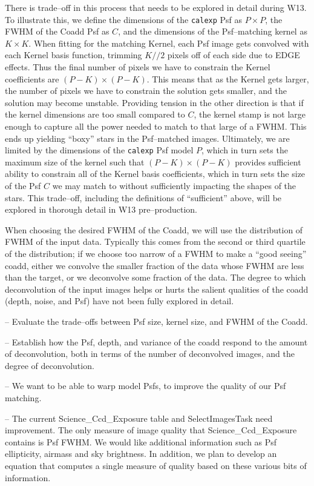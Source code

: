 \documentclass[prd, nofootinbib, floatfix, 11pt,tightenlines,times]{article}
\begin{document}
There is trade--off in this process that needs to be explored in
detail during W13.  To illustrate this, we define the dimensions of
the {\tt calexp} Psf as $P \times P$, the FWHM of the Coadd Psf as
$C$, and the dimensions of the Psf--matching kernel as $K \times K$.
When fitting for the matching Kernel, each Psf image gets convolved
with each Kernel basis function, trimming $K//2$ pixels off of each
side due to EDGE effects.  Thus the final number of pixels we have to
constrain the Kernel coefficients are $(P-K) \times (P-K)$.  This
means that as the Kernel gets larger, the number of pixels we have to
constrain the solution gets smaller, and the solution may become
unstable.  Providing tension in the other direction is that if the
kernel dimensions are too small compared to $C$, the kernel stamp is
not large enough to capture all the power needed to match to that
large of a FWHM.  This ends up yielding ``boxy'' stars in the
Psf--matched images.  Ultimately, we are limited by the dimensions of
the {\tt calexp} Psf model $P$, which in turn sets the maximum size of
the kernel such that $(P-K) \times (P-K)$ provides sufficient ability
to constrain all of the Kernel basis coefficients, which in turn sets
the size of the Psf $C$ we may match to without sufficiently impacting
the shapes of the stars.  This trade--off, including the definitions
of ``sufficient'' above, will be explored in thorough detail in W13
pre--production.

When choosing the desired FWHM of the Coadd, we will use the
distribution of FWHM of the input data.  Typically this comes from the
second or third quartile of the distribution; if we choose too narrow
of a FWHM to make a ``good seeing'' coadd, either we convolve the
smaller fraction of the data whose FWHM are less than the target, or
we deconvolve some fraction of the data.  The degree to which
deconvolution of the input images helps or hurts the salient qualities
of the coadd (depth, noise, and Psf) have not been fully explored in
detail.

-- Evaluate the trade--offs between Psf size, kernel size, and FWHM
of the Coadd.

-- Establish how the Psf, depth, and variance of the coadd respond to
the amount of deconvolution, both in terms of the number of
deconvolved images, and the degree of deconvolution.

-- We want to be able to warp model Psfs, to improve the quality of our Psf matching.

-- The current Science\_Ccd\_Exposure table and SelectImagesTask need improvement.
The only measure of image quality that Science\_Ccd\_Exposure contains is Psf FWHM.
We would like additional information such as Psf ellipticity, airmass and sky brightness.
In addition, we plan to develop an equation that computes a single measure of quality
based on these various bits of information.
\end{document}
